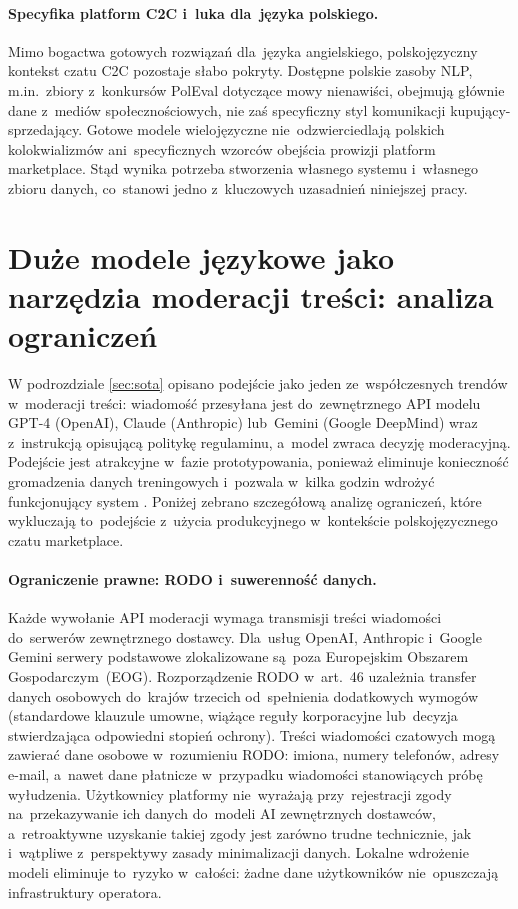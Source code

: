 \paragraph{Specyfika platform C2C i~luka dla~języka polskiego.}
Mimo bogactwa gotowych rozwiązań dla~języka angielskiego, polskojęzyczny kontekst
czatu C2C pozostaje słabo pokryty. Dostępne polskie zasoby NLP,
m.in.\ zbiory z~konkursów PolEval dotyczące mowy nienawiści,
obejmują głównie dane z~mediów społecznościowych, nie zaś specyficzny
styl komunikacji kupujący-sprzedający. Gotowe modele wielojęzyczne
nie~odzwierciedlają polskich kolokwializmów ani~specyficznych wzorców
obejścia prowizji platform marketplace. Stąd wynika potrzeba stworzenia
własnego systemu i~własnego zbioru danych, co~stanowi jedno z~kluczowych
uzasadnień niniejszej pracy.

\section{Duże modele językowe jako narzędzia moderacji treści: analiza ograniczeń}
\label{sec:llm-ograniczenia}

W podrozdziale \ref{sec:sota} opisano podejście  jako jeden
ze~współczesnych trendów w~moderacji treści: wiadomość przesyłana jest do~zewnętrznego
API modelu GPT-4 (OpenAI), Claude (Anthropic) lub~Gemini (Google DeepMind) wraz
z~instrukcją opisującą politykę regulaminu, a~model zwraca decyzję moderacyjną.
Podejście jest atrakcyjne w~fazie prototypowania, ponieważ eliminuje konieczność
gromadzenia danych treningowych i~pozwala w~kilka godzin wdrożyć funkcjonujący
system \cite{bib:gilardi2023}. Poniżej zebrano szczegółową analizę ograniczeń,
które wykluczają to~podejście z~użycia produkcyjnego w~kontekście polskojęzycznego
czatu marketplace.

\paragraph{Ograniczenie prawne: RODO i~suwerenność danych.}
Każde wywołanie API moderacji wymaga transmisji treści wiadomości do~serwerów
zewnętrznego dostawcy. Dla~usług OpenAI, Anthropic i~Google Gemini serwery
podstawowe zlokalizowane są~poza Europejskim Obszarem Gospodarczym~(EOG).
Rozporządzenie RODO w~art.~46 uzależnia transfer danych osobowych do~krajów
trzecich od~spełnienia dodatkowych wymogów (standardowe klauzule umowne,
wiążące reguły korporacyjne lub~decyzja stwierdzająca odpowiedni stopień
ochrony). Treści wiadomości czatowych mogą zawierać dane osobowe
w~rozumieniu RODO: imiona, numery telefonów, adresy e-mail, a~nawet
dane płatnicze w~przypadku wiadomości stanowiących próbę wyłudzenia.
Użytkownicy platformy nie~wyrażają przy~rejestracji zgody na~przekazywanie
ich danych do~modeli AI zewnętrznych dostawców, a~retroaktywne uzyskanie
takiej zgody jest zarówno trudne technicznie, jak i~wątpliwe z~perspektywy
zasady minimalizacji danych. Lokalne wdrożenie modeli eliminuje to~ryzyko
w~całości: żadne dane użytkowników nie~opuszczają infrastruktury operatora.

